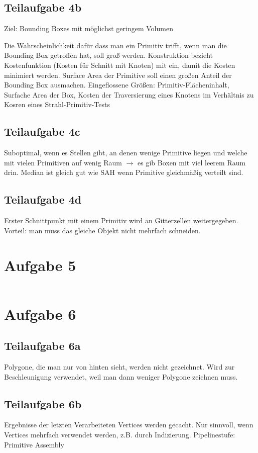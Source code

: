 \documentclass[a4paper]{scrartcl}
\begin{document}
\subsection*{Teilaufgabe 4b}
Ziel: Bounding Boxes mit möglichst geringem Volumen

Die Wahrscheinlichkeit dafür dass man ein Primitiv trifft, wenn man die
Bounding Box getroffen hat, soll groß werden. Konstruktion bezieht
Kostenfunktion (Kosten für Schnitt mit Knoten) mit ein, damit die Kosten
minimiert werden. Surface Area der Primitive soll einen großen Anteil der
Bounding Box ausmachen. Eingeflossene Größen: Primitiv-Flächeninhalt, Surfache
Area der Box, Kosten der Traversierung eines Knotens im Verhältnis zu Kosren
eines Strahl-Primitiv-Tests

\subsection*{Teilaufgabe 4c}
Suboptimal, wenn es Stellen gibt, an denen wenige Primitive liegen und welche
mit vielen Primitiven auf wenig Raum $\rightarrow$ es gib Boxen mit viel leerem
Raum drin. Median ist gleich gut wie SAH wenn Primitive gleichmäßig verteilt
sind.

\subsection*{Teilaufgabe 4d}
Erster Schnittpunkt mit einem Primitiv wird an Gitterzellen weitergegeben.
Vorteil: man muss das gleiche Objekt nicht mehrfach schneiden.

\clearpage
\section*{Aufgabe 5}
\inputminted[linenos, numbersep=5pt, tabsize=4, frame=lines, label=shader5.frag]{glsl}{shader5.frag}

\section*{Aufgabe 6}
\subsection*{Teilaufgabe 6a}
Polygone, die man nur von hinten sieht, werden nicht gezeichnet. Wird zur
Beschleunigung verwendet, weil man dann weniger Polygone zeichnen muss.

\subsection*{Teilaufgabe 6b}
Ergebnisse der letzten Verarbeiteten Vertices werden gecacht. Nur sinnvoll,
wenn Vertices mehrfach verwendet werden, z.B. durch Indizierung. Pipelinestufe:
Primitive Assembly
\end{document}
